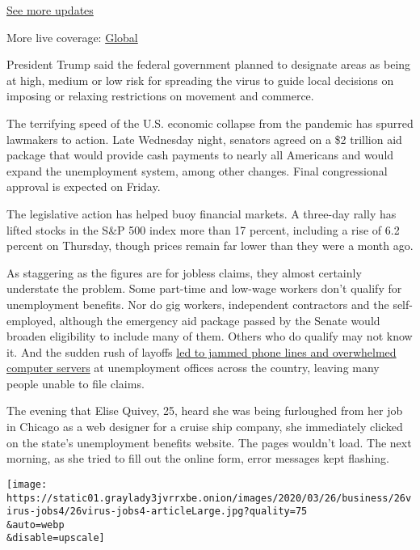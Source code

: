 \href{https://www.nytimes3xbfgragh.onion/live/2020/08/17/business/stock-market-today-coronavirus?action=click\&pgtype=Article\&state=default\&region=MAIN_CONTENT_1\&context=storylines_live_updates}{See
more updates}

More live coverage:
\href{https://www.nytimes3xbfgragh.onion/2020/08/17/world/coronavirus-covid.html?action=click\&pgtype=Article\&state=default\&region=MAIN_CONTENT_1\&context=storylines_live_updates}{Global}

President Trump said the federal government planned to designate areas
as being at high, medium or low risk for spreading the virus to guide
local decisions on imposing or relaxing restrictions on movement and
commerce.

The terrifying speed of the U.S. economic collapse from the pandemic has
spurred lawmakers to action. Late Wednesday night, senators agreed on a
\$2 trillion aid package that would provide cash payments to nearly all
Americans and would expand the unemployment system, among other changes.
Final congressional approval is expected on Friday.

The legislative action has helped buoy financial markets. A three-day
rally has lifted stocks in the S\&P 500 index more than 17 percent,
including a rise of 6.2 percent on Thursday, though prices remain far
lower than they were a month ago.

As staggering as the figures are for jobless claims, they almost
certainly understate the problem. Some part-time and low-wage workers
don't qualify for unemployment benefits. Nor do gig workers, independent
contractors and the self-employed, although the emergency aid package
passed by the Senate would broaden eligibility to include many of them.
Others who do qualify may not know it. And the sudden rush of layoffs
\href{https://www.nytimes3xbfgragh.onion/2020/03/19/business/coronavirus-unemployment-states.html}{led
to jammed phone lines and overwhelmed computer servers} at unemployment
offices across the country, leaving many people unable to file claims.

The evening that Elise Quivey, 25, heard she was being furloughed from
her job in Chicago as a web designer for a cruise ship company, she
immediately clicked on the state's unemployment benefits website. The
pages wouldn't load. The next morning, as she tried to fill out the
online form, error messages kept flashing.

\texttt{[image: https://static01.graylady3jvrrxbe.onion/images/2020/03/26/business/26virus-jobs4/26virus-jobs4-articleLarge.jpg?quality=75\\\&auto=webp\\\&disable=upscale]}

